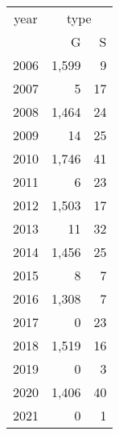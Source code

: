 \footnotesize\begin{tabular}[t]{lrr}
\toprule
\multicolumn{1}{c}{year} & \multicolumn{2}{c}{type} \\
\cmidrule(l{3pt}r{3pt}){1-1} \cmidrule(l{3pt}r{3pt}){2-3}
  & G & S\\
\midrule
2006 & 1,599 & 9\\
2007 & 5 & 17\\
2008 & 1,464 & 24\\
2009 & 14 & 25\\
2010 & 1,746 & 41\\
2011 & 6 & 23\\
2012 & 1,503 & 17\\
2013 & 11 & 32\\
2014 & 1,456 & 25\\
2015 & 8 & 7\\
2016 & 1,308 & 7\\
2017 & 0 & 23\\
2018 & 1,519 & 16\\
2019 & 0 & 3\\
2020 & 1,406 & 40\\
2021 & 0 & 1\\
\bottomrule
\end{tabular}
